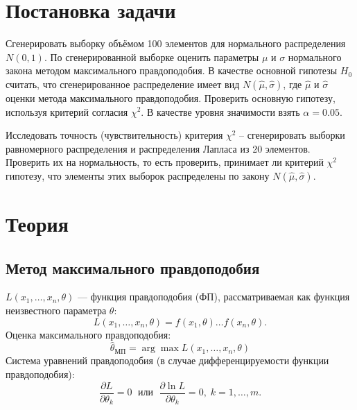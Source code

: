 \documentclass[12pt]{article}
\begin{document}
\begin{flushleft}

\setlength{\parindent}{1cm}

\tableofcontents

\newpage

\listoftables

\newpage

\section{Постановка задачи}

	Сгенерировать выборку объёмом 100 элементов для нормального распределения $N(0,1)$.
	По сгенерированной выборке оценить параметры $\mu$ и $\sigma$ нормального закона методом максимального правдоподобия.
	В качестве основной гипотезы $H_0$ считать, что сгенерированное распределение имеет вид $N(\hat{\mu}, \hat{\sigma})$, где $\hat{\mu}$ и $\hat{\sigma}$ оценки метода максимального правдоподобия.
	Проверить основную гипотезу, используя критерий согласия $\chi^2$. В качестве уровня значимости взять $\alpha = 0.05$.

    Исследовать точность (чувствительность) критерия $\chi^2$ -- сгенерировать выборки равномерного распределения и распределения Лапласа из 20 элементов. Проверить их на нормальность, то есть проверить, принимает ли критерий $\chi^2$ гипотезу, что элементы этих выборок распределены по закону $N(\hat{\mu}, \hat{\sigma})$.

\newpage

\section{Теория}

	\subsection{Метод максимального правдоподобия}
	$L(x_1,\dots,x_n,\theta)$ --- функция правдоподобия (ФП), рассматриваемая как функция неизвестного параметра $\theta$\cite{theory}\cite{maks}:
	\begin{equation}
		L(x_1,\dots,x_n,\theta) = f(x_1,\theta)\dots f(x_n, \theta).
	\end{equation}
	Оценка максимального правдоподобия:
	\begin{equation}
		\hat{\theta}_{\text{МП}} = \arg\max L(x_1,\dots,x_n,\theta)
	\end{equation}
	Система уравнений правдоподобия (в случае дифференцируемости функции правдоподобия):
	\begin{equation}
		\frac{\partial L}{\partial \theta_k} = 0 \; \text{ или } \; \frac{\partial \ln L}{\partial \theta_k} = 0, \; k = 1,\dots,m.
		\label{difEquation}
	\end{equation}


\end{flushleft}
\end{document}
